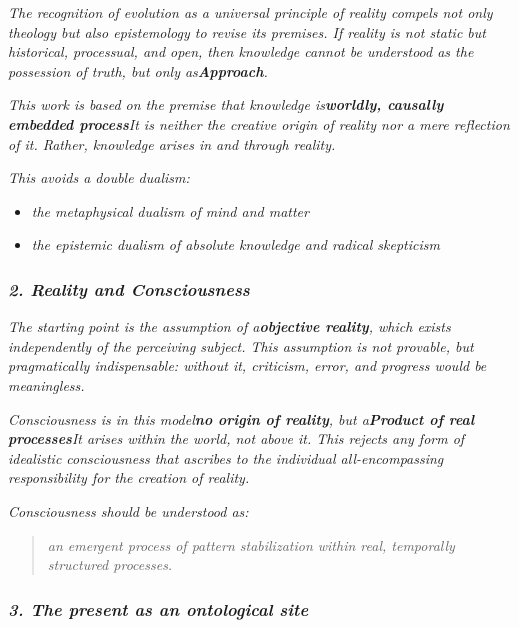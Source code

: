 \documentclass[
]{article}
\begin{document}
\emph{The recognition of evolution as a universal principle of reality compels not only theology but also epistemology to revise its premises. If reality is not static but historical, processual, and open, then knowledge cannot be understood as the possession of truth, but only as\textbf{Approach}.}

\emph{This work is based on the premise that knowledge is\textbf{worldly, causally embedded process}It is neither the creative origin of reality nor a mere reflection of it. Rather, knowledge arises in and through reality.}

\emph{This avoids a double dualism:}

\begin{itemize}
\item
  \emph{the metaphysical dualism of mind and matter}
\item
  \emph{the epistemic dualism of absolute knowledge and radical skepticism}
\end{itemize}

\subsubsection{\texorpdfstring{\emph{\textbf{2. Reality and Consciousness}}}{2. Reality and Consciousness}}\label{reality-and-consciousness}

\emph{The starting point is the assumption of a\textbf{objective reality}, which exists independently of the perceiving subject. This assumption is not provable, but pragmatically indispensable: without it, criticism, error, and progress would be meaningless.}

\emph{Consciousness is in this model\textbf{no origin of reality}, but a\textbf{Product of real processes}It arises within the world, not above it. This rejects any form of idealistic consciousness that ascribes to the individual all-encompassing responsibility for the creation of reality.}

\emph{Consciousness should be understood as:}

\begin{quote}
\emph{an emergent process of pattern stabilization within real, temporally structured processes.}
\end{quote}

\subsubsection{\texorpdfstring{\emph{\textbf{3. The present as an ontological site}}}{3. The present as an ontological site}}\label{the-present-as-an-ontological-site}
\end{document}
